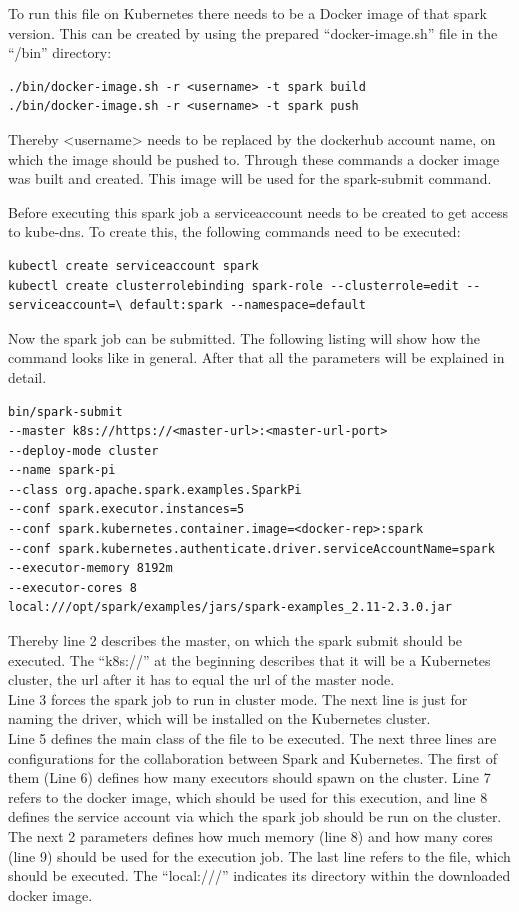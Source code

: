 To run this file on Kubernetes there needs to be a Docker image of that spark version. This can be created by using the prepared ``docker-image.sh'' file in the ``/bin'' directory:
\begin{lstlisting}[caption={Create Spark 2.3.0 docker image},captionpos=b]
./bin/docker-image.sh -r <username> -t spark build
./bin/docker-image.sh -r <username> -t spark push
\end{lstlisting}
Thereby <username> needs to be replaced by the dockerhub account name, on which the image should be pushed to. Through these commands a docker image was built and created. This image will be used for the spark-submit command.

Before executing this spark job a serviceaccount needs to be created to get access to kube-dns. To create this, the following commands need to be executed:
\begin{lstlisting}[caption={Create spark serviceaccount for Kubernetes},captionpos=b]
kubectl create serviceaccount spark
kubectl create clusterrolebinding spark-role --clusterrole=edit --serviceaccount=\ default:spark --namespace=default
\end{lstlisting}

Now the spark job can be submitted. The following listing will show how the command looks like in general. After that all the parameters will be explained in detail.

\begin{lstlisting}[caption={Spark-submit to Kubernetes master},captionpos=b]
bin/spark-submit 
--master k8s://https://<master-url>:<master-url-port> 
--deploy-mode cluster 
--name spark-pi 
--class org.apache.spark.examples.SparkPi 
--conf spark.executor.instances=5 
--conf spark.kubernetes.container.image=<docker-rep>:spark 
--conf spark.kubernetes.authenticate.driver.serviceAccountName=spark 
--executor-memory 8192m 
--executor-cores 8 
local:///opt/spark/examples/jars/spark-examples_2.11-2.3.0.jar
\end{lstlisting}

Thereby line 2 describes the master, on which the spark submit should be executed. The ``k8s://'' at the beginning describes that it will be a Kubernetes cluster, the url after it has to equal the url of the master node.\\
Line 3 forces the spark job to run in cluster mode. The next line is just for naming the driver, which will be installed on the Kubernetes cluster.\\
Line 5 defines the main class of the file to be executed. The next three lines are configurations for the collaboration between Spark and Kubernetes. The first of them (Line 6) defines how many executors should spawn on the cluster. Line 7 refers to the docker image, which should be used for this execution, and line 8 defines the service account via which the spark job should be run on the cluster.\\
The next 2 parameters defines how much memory (line 8) and how many cores (line 9) should be used for the execution job. 
The last line refers to the file, which should be executed. The ``local:///'' indicates its directory within the downloaded docker image.

